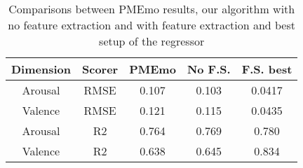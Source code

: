 \begin{table}[h!]
	\centering
	\begin{tabular}{|c|c|c||c||c|}
		\hline
		Dimension & Scorer & PMEmo & No F.S. & F.S. best \\ [0.5ex] 
		\hline\hline Arousal & RMSE & 0.107 & 0.103 & 0.0417 \\ 
		\hline Valence & RMSE & 0.121 & 0.115 & 0.0435 \\
		\hline Arousal & R2 & 0.764 & 0.769 & 0.780 \\
		\hline Valence & R2 & 0.638 & 0.645 & 0.834 \\
		\hline
	\end{tabular}
	\caption{Comparisons between PMEmo results, our algorithm with no feature extraction and with feature extraction and best setup of the regressor}
	\label{table:comparisons}
\end{table}

